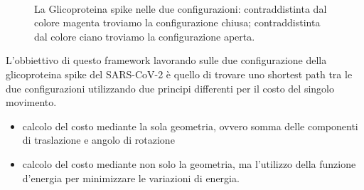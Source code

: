 \begin{figure}[H]
	\centering
	 \\
	\caption{La Glicoproteina spike nelle due configurazioni: contraddistinta dal colore magenta troviamo la configurazione chiusa; contraddistinta dal colore ciano troviamo la configurazione aperta.}
	\label{fig:onformazioneupdown}
\end{figure}

L'obbiettivo di questo framework lavorando sulle due configurazione della glicoproteina spike del SARS-CoV-2 è quello di trovare uno shortest path tra le due configurazioni utilizzando due principi differenti per il costo del singolo movimento.
\vspace{10pt}
\begin{itemize}
	\item calcolo del costo mediante la sola geometria, ovvero somma delle componenti di traslazione e angolo di rotazione 
	\vspace{5pt}
	\item calcolo del costo mediante non solo la geometria, ma l'utilizzo della funzione d'energia per minimizzare le variazioni di energia. 
\end{itemize}

